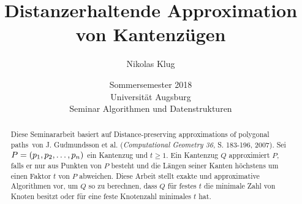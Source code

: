 \documentclass[11pt]{article}
\title{Distanzerhaltende Approximation von Kantenzügen}
\author{Nikolas Klug}
\date{Sommersemester 2018
	\\ Universität Augsburg
	\\ Seminar Algorithmen und Datenstrukturen
	}
\begin{document}
    \maketitle

    \begin{abstract}
        Diese Seminararbeit basiert auf \glqq Distance-preserving approximations of polygonal paths\grqq\ von J. Gudmundsson et al. (\textit{Computational Geometry 36}, S. 183-196, 2007). 
        Sei $P = (p_1, p_2, \mathellipsis, p_n)$ ein Kantenzug und $t \geq 1$. Ein Kantenzug $Q$ approximiert $P$, falls er nur aus Punkten von $P$ besteht und die Längen seiner Kanten höchstens um einen Faktor $t$ von $P$ abweichen. 
        Diese Arbeit stellt exakte und approximative Algorithmen vor, um $Q$ so zu berechnen, dass $Q$ für festes $t$ die minimale Zahl von Knoten besitzt oder für eine feste Knotenzahl minimales $t$ hat.
    \end{abstract}
\end{document}
